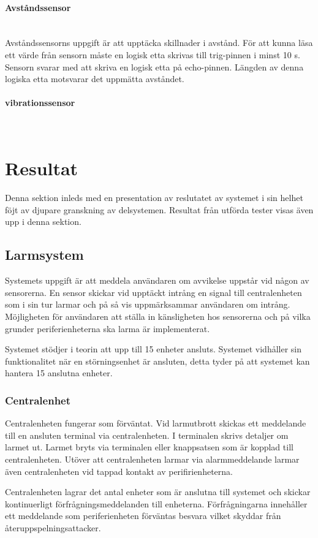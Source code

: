 \documentclass[a4paper]{article}
\newcommand{\subsubsubsection}[1]{\paragraph{#1}\mbox{}\\}
\begin{document}
\subsubsubsection{Avståndssensor}
Avståndssensorns uppgift är att upptäcka skillnader i avstånd.
För att kunna läsa ett värde från sensorn måste en logisk etta skrivas till trig-pinnen i minst 10 \textmu s.
Sensorn svarar med att skriva en logisk etta på echo-pinnen.
Längden av denna logiska etta motsvarar det uppmätta avståndet.

\subsubsubsection{vibrationssensor}

\section{Resultat}
Denna sektion inleds med en presentation av reslutatet av systemet i sin helhet föjt av djupare granskning av delsystemen. Resultat från utförda tester visas även upp i denna sektion.

\subsection{Larmsystem}
Systemets uppgift är att meddela användaren om avvikelse uppstår vid någon av sensorerna. En sensor skickar vid upptäckt intrång en signal till centralenheten som i sin tur larmar och på så vis uppmärksammar användaren om intrång. Möjligheten för användaren att ställa in känsligheten hos sensorerna och på vilka grunder periferienheterna ska larma är implementerat.

Systemet stödjer i teorin att upp till 15 enheter ansluts. Systemet vidhåller sin funktionalitet när en störningsenhet är ansluten, detta tyder på att systemet kan hantera 15 anslutna enheter.

\subsubsection{Centralenhet}
Centralenheten fungerar som förväntat. Vid larmutbrott skickas ett meddelande till en ansluten terminal via centralenheten. I terminalen skrivs detaljer om larmet ut. Larmet bryts via terminalen eller knappsatsen som är kopplad till centralenheten. Utöver att centralenheten larmar via alarmmeddelande larmar även centralenheten vid tappad kontakt av perifirienheterna.

Centralenheten lagrar det antal enheter som är anslutna till systemet och skickar kontinuerligt förfrågningsmeddelanden till enheterna. Förfrågningarna innehåller ett meddelande som periferienheten förväntas besvara vilket skyddar från återuppspelningsattacker.
\end{document}
